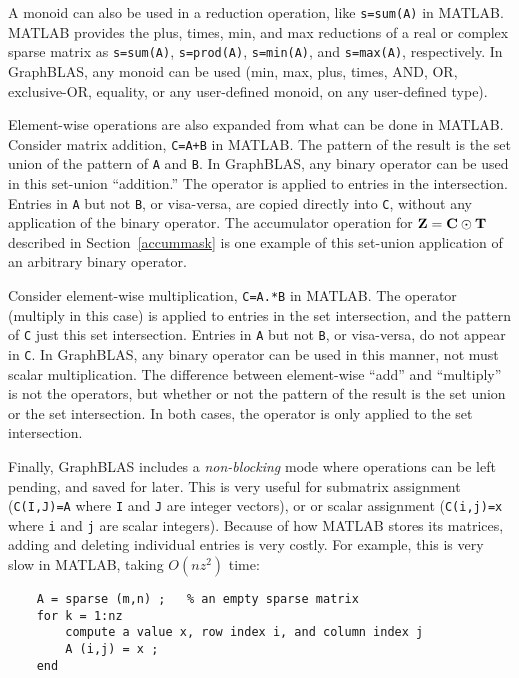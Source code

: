 \documentclass[12pt]{article}
\begin{document}
A monoid can also be used in a reduction operation, like \verb's=sum(A)' in
MATLAB.  MATLAB provides the plus, times, min, and max reductions of a real or
complex sparse matrix as \verb's=sum(A)',  \verb's=prod(A)', \verb's=min(A)',
and \verb's=max(A)', respectively.  In GraphBLAS, any monoid can be used (min,
max, plus, times, AND, OR, exclusive-OR, equality, or any user-defined monoid,
on any user-defined type).

Element-wise operations are also expanded from what can be done in MATLAB.
Consider matrix addition, \verb'C=A+B' in MATLAB.  The pattern of the result is
the set union of the pattern of \verb'A' and \verb'B'.  In GraphBLAS, any
binary operator can be used in this set-union ``addition.''  The operator is
applied to entries in the intersection.  Entries in \verb'A' but not \verb'B',
or visa-versa, are copied directly into \verb'C', without any application of
the binary operator.  The accumulator operation for ${\bf Z = C \odot T}$
described in Section~\ref{accummask} is one example of this set-union
application of an arbitrary binary operator.

Consider element-wise multiplication, \verb'C=A.*B' in MATLAB.  The operator
(multiply in this case) is applied to entries in the set intersection, and the
pattern of \verb'C' just this set intersection.  Entries in \verb'A' but not
\verb'B', or visa-versa, do not appear in \verb'C'.  In GraphBLAS, any binary
operator can be used in this manner, not must scalar multiplication.  The
difference between element-wise ``add'' and ``multiply'' is not the operators,
but whether or not the pattern of the result is the set union or the set
intersection.  In both cases, the operator is only applied to the set
intersection.

Finally, GraphBLAS includes a {\em non-blocking} mode where operations can be
left pending, and saved for later.  This is very useful for submatrix
assignment (\verb'C(I,J)=A' where \verb'I' and \verb'J' are integer vectors),
or or scalar assignment (\verb'C(i,j)=x' where \verb'i' and \verb'j' are scalar
integers).  Because of how MATLAB stores its matrices, adding and deleting
individual entries is very costly.  For example, this is very slow in MATLAB,
taking $O(nz^2)$ time:

    \begin{mdframed}
    {\footnotesize
    \begin{verbatim}
    A = sparse (m,n) ;   % an empty sparse matrix
    for k = 1:nz
        compute a value x, row index i, and column index j
        A (i,j) = x ;
    end\end{verbatim}}\end{mdframed}
\end{document}
